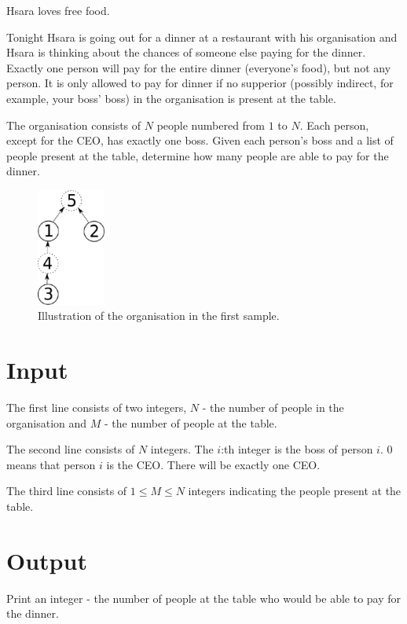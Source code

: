 Hsara loves free food.

Tonight Hsara is going out for a dinner at a restaurant with his organisation and Hsara is thinking about the chances of someone else paying for the dinner. Exactly one person will pay for the entire dinner (everyone's food), but not any person. It is only allowed to pay for dinner if no supperior (possibly indirect, for example, your boss' boss) in the organisation is present at the table.

The organisation consists of $N$ people numbered from $1$ to $N$. Each person, except for the CEO, has exactly one boss. Given each person's boss and a list of people present at the table, determine how many people are able to pay for the dinner.

\begin{figure}[h!]
	\begin{center}
		\includegraphics[width=0.2\textwidth]{tree.eps}
		\caption{Illustration of the organisation in the first sample.}
	\end{center}
\end{figure}


\section*{Input}
The first line consists of two integers, $N$ - the number of people in the organisation and $M$ - the number of people at the table.

The second line consists of $N$ integers. The $i$:th integer is the boss of person $i$. 0 means that person $i$ is the CEO. There will be exactly one CEO.

The third line consists of $1 \le M \le N$ integers indicating the people present at the table.

\section*{Output}
Print an integer - the number of people at the table who would be able to pay for the dinner.

